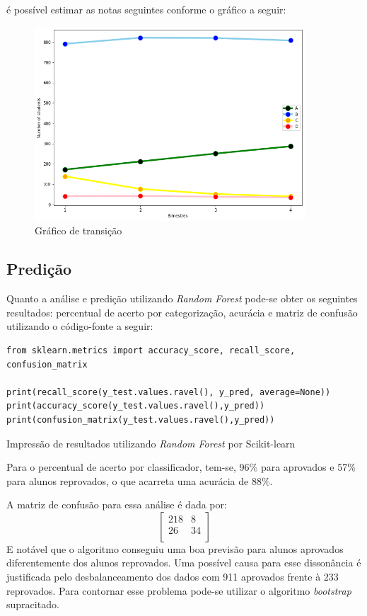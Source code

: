 \documentclass{article}
\begin{document}
é possível estimar as notas seguintes conforme o gráfico a seguir:

\begin{figure}[H]
\centering
\includegraphics[width=0.9\textwidth]{graf.png}
\caption{Gráfico de transição}
\label{graf}
\end{figure}

\subsection{Predição}

Quanto a análise e predição utilizando \emph{Random Forest} pode-se obter os seguintes resultados: percentual de acerto por categorização, acurácia e matriz de confusão utilizando o código-fonte a seguir: 

\begin{listing}[H]
\begin{verbatim}
from sklearn.metrics import accuracy_score, recall_score, confusion_matrix

print(recall_score(y_test.values.ravel(), y_pred, average=None))
print(accuracy_score(y_test.values.ravel(),y_pred))
print(confusion_matrix(y_test.values.ravel(),y_pred))
\end{verbatim}
\caption{Impressão de resultados utilizando \emph{Random Forest} por Scikit-learn}
\end{listing}

Para o percentual de acerto por classificador, tem-se, 96\% para aprovados e 57\% para alunos reprovados, o que acarreta uma acurácia de 88\%.

A matriz de confusão para essa análise é dada por:
\[
\begin{bmatrix}
    218 & 8 \\
    26 & 34 \\
\end{bmatrix} 
\]
E notável que o algoritmo conseguiu uma boa previsão para alunos aprovados diferentemente dos alunos reprovados. Uma possível causa para esse dissonância é justificada pelo desbalanceamento dos dados com 911 aprovados frente à 233 reprovados. Para contornar esse problema pode-se utilizar o algoritmo  \emph{bootstrap} supracitado.



 
\end{document}
